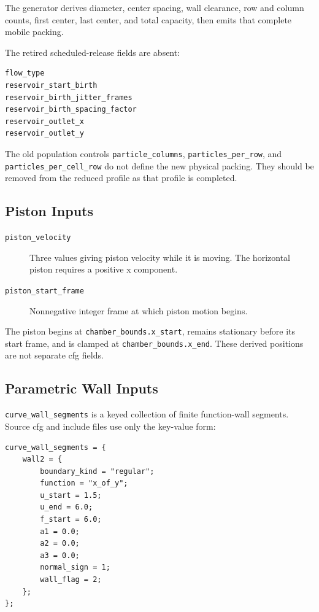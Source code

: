 The generator derives diameter, center spacing, wall clearance, row and column
counts, first center, last center, and total capacity, then emits that complete
mobile packing.

The retired scheduled-release fields are absent:
\begin{verbatim}
flow_type
reservoir_start_birth
reservoir_birth_jitter_frames
reservoir_birth_spacing_factor
reservoir_outlet_x
reservoir_outlet_y
\end{verbatim}

The old population controls
\texttt{particle\_columns}, \texttt{particles\_per\_row}, and
\texttt{particles\_per\_cell\_row} do not define the new physical packing.
They should be removed from the reduced profile as that profile is completed.

\subsection{Piston Inputs}

\begin{description}
    \item[\texttt{piston\_velocity}] Three values giving piston velocity while
    it is moving.  The
    horizontal piston requires a positive x component.
    \item[\texttt{piston\_start\_frame}] Nonnegative integer frame at which
    piston motion begins.
\end{description}

The piston begins at \texttt{chamber\_bounds.x\_start}, remains stationary
before its start frame, and is clamped at
\texttt{chamber\_bounds.x\_end}.  These derived positions are not separate
cfg fields.

\subsection{Parametric Wall Inputs}

\texttt{curve\_wall\_segments} is a keyed collection of finite function-wall
segments.  Source cfg and include files use only the key-value form:
\begin{verbatim}
curve_wall_segments = {
    wall2 = {
        boundary_kind = "regular";
        function = "x_of_y";
        u_start = 1.5;
        u_end = 6.0;
        f_start = 6.0;
        a1 = 0.0;
        a2 = 0.0;
        a3 = 0.0;
        normal_sign = 1;
        wall_flag = 2;
    };
};
\end{verbatim}

